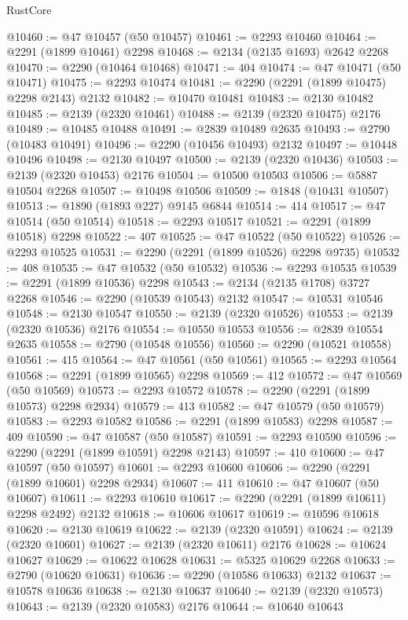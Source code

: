 \begin{lexlean}{RustCore}
\begin{coremodule}
@10460 := @47 @10457 (@50 @10457)
@10461 := @2293 @10460
@10464 := @2291 (@1899 @10461) @2298
@10468 := @2134 (@2135 @1693) @2642 @2268
@10470 := @2290 (@10464 @10468)
@10471 := 404
@10474 := @47 @10471 (@50 @10471)
@10475 := @2293 @10474
@10481 := @2290 (@2291 (@1899 @10475) @2298 @2143) @2132
@10482 := @10470 @10481
@10483 := @2130 @10482
@10485 := @2139 (@2320 @10461)
@10488 := @2139 (@2320 @10475) @2176
@10489 := @10485 @10488
@10491 := @2839 @10489 @2635
@10493 := @2790 (@10483 @10491)
@10496 := @2290 (@10456 @10493) @2132
@10497 := @10448 @10496
@10498 := @2130 @10497
@10500 := @2139 (@2320 @10436)
@10503 := @2139 (@2320 @10453) @2176
@10504 := @10500 @10503
@10506 := @5887 @10504 @2268
@10507 := @10498 @10506
@10509 := @1848 (@10431 @10507)
@10513 := @1890 (@1893 @227) @9145 @6844
@10514 := 414
@10517 := @47 @10514 (@50 @10514)
@10518 := @2293 @10517
@10521 := @2291 (@1899 @10518) @2298
@10522 := 407
@10525 := @47 @10522 (@50 @10522)
@10526 := @2293 @10525
@10531 := @2290 (@2291 (@1899 @10526) @2298 @9735)
@10532 := 408
@10535 := @47 @10532 (@50 @10532)
@10536 := @2293 @10535
@10539 := @2291 (@1899 @10536) @2298
@10543 := @2134 (@2135 @1708) @3727 @2268
@10546 := @2290 (@10539 @10543) @2132
@10547 := @10531 @10546
@10548 := @2130 @10547
@10550 := @2139 (@2320 @10526)
@10553 := @2139 (@2320 @10536) @2176
@10554 := @10550 @10553
@10556 := @2839 @10554 @2635
@10558 := @2790 (@10548 @10556)
@10560 := @2290 (@10521 @10558)
@10561 := 415
@10564 := @47 @10561 (@50 @10561)
@10565 := @2293 @10564
@10568 := @2291 (@1899 @10565) @2298
@10569 := 412
@10572 := @47 @10569 (@50 @10569)
@10573 := @2293 @10572
@10578 := @2290 (@2291 (@1899 @10573) @2298 @2934)
@10579 := 413
@10582 := @47 @10579 (@50 @10579)
@10583 := @2293 @10582
@10586 := @2291 (@1899 @10583) @2298
@10587 := 409
@10590 := @47 @10587 (@50 @10587)
@10591 := @2293 @10590
@10596 := @2290 (@2291 (@1899 @10591) @2298 @2143)
@10597 := 410
@10600 := @47 @10597 (@50 @10597)
@10601 := @2293 @10600
@10606 := @2290 (@2291 (@1899 @10601) @2298 @2934)
@10607 := 411
@10610 := @47 @10607 (@50 @10607)
@10611 := @2293 @10610
@10617 := @2290 (@2291 (@1899 @10611) @2298 @2492) @2132
@10618 := @10606 @10617
@10619 := @10596 @10618
@10620 := @2130 @10619
@10622 := @2139 (@2320 @10591)
@10624 := @2139 (@2320 @10601)
@10627 := @2139 (@2320 @10611) @2176
@10628 := @10624 @10627
@10629 := @10622 @10628
@10631 := @5325 @10629 @2268
@10633 := @2790 (@10620 @10631)
@10636 := @2290 (@10586 @10633) @2132
@10637 := @10578 @10636
@10638 := @2130 @10637
@10640 := @2139 (@2320 @10573)
@10643 := @2139 (@2320 @10583) @2176
@10644 := @10640 @10643

\end{coremodule}
\end{lexlean}
